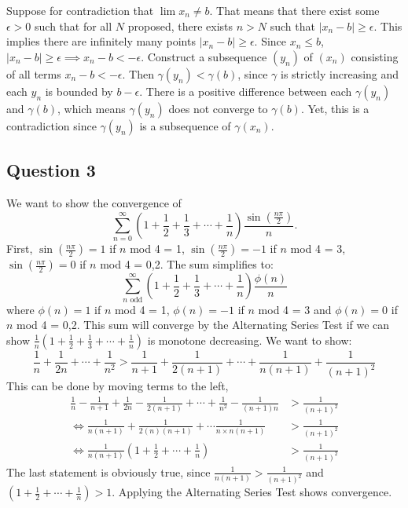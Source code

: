 \documentclass{article}
\begin{document}

Suppose for contradiction that $\lim x_n \neq b$. That means that there exist some $\epsilon>0$ such that for all $N$ proposed, there exists $n>N$ such that $|x_n -b|\geq \epsilon$. This implies there are infinitely many points $|x_n -b|\geq \epsilon$. Since $x_n \leq b$, $|x_n -b|\geq \epsilon \implies x_n-b<-\epsilon$. Construct a subsequence $(y_n)$ of $(x_n)$ consisting of all terms $x_n-b<-\epsilon$. Then $\gamma(y_n) < \gamma(b)$, since $\gamma$ is strictly increasing and each $y_n$ is bounded by $b-\epsilon$. There is a positive difference between each $\gamma(y_n)$ and $\gamma(b)$, which means $\gamma(y_n)$ does not converge to $\gamma(b)$. Yet, this is a contradiction since $\gamma(y_n)$ is a subsequence of $\gamma(x_n)$.

\subsection*{Question 3}
We want to show the convergence of $$\sum_{n=0}^{\infty} \left(1+\frac{1}{2}+\frac{1}{3} + \cdots + \frac{1}{n}\right) \frac{\sin(\frac{n\pi}{2})}{n}.$$
First, $\sin(\frac{n\pi}{2})=1$ if $n$ mod 4 = 1, $\sin(\frac{n\pi}{2})=-1$ if $n$ mod 4 = 3, $\sin(\frac{n\pi}{2})=0$ if $n$ mod 4 = 0,2. The sum simplifies to:
\begin{equation*}
    \sum_{\text{$n$ odd}}^{\infty} \left(1+\frac{1}{2}+\frac{1}{3} + \cdots + \frac{1}{n}\right) \frac{\phi(n)}{n}
\end{equation*}
where $\phi(n)=1$ if $n$ mod 4 = 1, $\phi(n)=-1$ if $n$ mod 4 = 3 and $\phi(n)=0$ if $n$ mod 4 = 0,2. This sum will converge by the Alternating Series Test if we can show $\frac{1}{n}\left(1+\frac{1}{2}+\frac{1}{3} + \cdots + \frac{1}{n}\right)$ is monotone decreasing. We want to show:
\begin{equation*}
    \frac{1}{n} + \frac{1}{2n} + \cdots + \frac{1}{n^2} > \frac{1}{n+1} + \frac{1}{2(n+1)} + \cdots + \frac{1}{n(n+1)} + \frac{1}{(n+1)^2}
\end{equation*}
This can be done by moving terms to the left,
\begin{align*}
    \frac{1}{n} - \frac{1}{n+1} + \frac{1}{2n} - \frac{1}{2(n+1)} + \cdots + \frac{1}{n^2} - \frac{1}{(n+1)n} &> \frac{1}{(n+1)^2} \\
    \iff \frac{1}{n(n+1)} + \frac{1}{2(n)(n+1)} + \cdots \frac{1}{n \times n(n+1)} &> \frac{1}{(n+1)^2} \\
    \iff \frac{1}{n(n+1)} \left( 1+\frac{1}{2}+ \cdots + \frac{1}{n}\right) &> \frac{1}{(n+1)^2}
\end{align*}
The last statement is obviously true, since $\frac{1}{n(n+1)}> \frac{1}{(n+1)^2}$ and $\left( 1+\frac{1}{2}+ \cdots + \frac{1}{n}\right)>1$. Applying the Alternating Series Test shows convergence.
\end{document}
